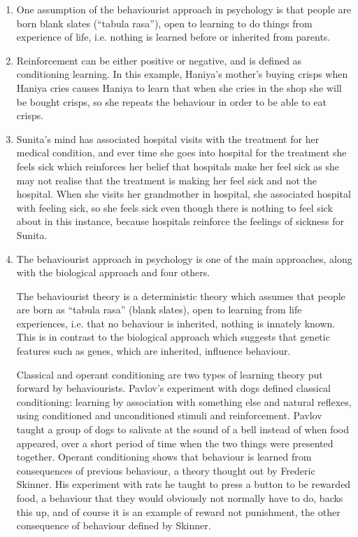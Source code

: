 \documentclass[a4paper]{article}
\begin{document}
	
\begin{enumerate}
	\item{One assumption of the behaviourist approach in psychology is that people are born blank slates (``tabula rasa''), open to learning to do things from experience of life, i.e. nothing is learned before or inherited from parents.}
	\item{Reinforcement can be either positive or negative, and is defined as conditioning learning.  In this example, Haniya's mother's buying crisps when Haniya cries causes Haniya to learn that when she cries in the shop she will be bought crisps, so she repeats the behaviour in order to be able to eat crisps.}
	\item{Sunita's mind has associated hospital visits with the treatment for her medical condition, and ever time she goes into hospital for the treatment she feels sick which reinforces her belief that hospitals make her feel sick as she may not realise that the treatment is making her feel sick and not the hospital.  When she visits her grandmother in hospital, she associated hospital with feeling sick, so she feels sick even though there is nothing to feel sick about in this instance, because hospitals reinforce the feelings of sickness for Sunita.}
	\item{The behaviourist approach in psychology is one of the main approaches, along with the biological approach and four others.
	
	The behaviourist theory is a deterministic theory which assumes that people are born as ``tabula rasa'' (blank slates), open to learning from life experiences, i.e. that no behaviour is inherited, nothing is innately known.  This is in contrast to the biological approach which suggests that genetic features such as genes, which are inherited, influence behaviour.
	
	Classical and operant conditioning are two types of learning theory put forward by behaviourists.  Pavlov's experiment with dogs defined classical conditioning: learning by association with something else and natural reflexes, using conditioned and unconditioned stimuli and reinforcement.  Pavlov taught a group of dogs to salivate at the sound of a bell instead of when food appeared, over a short period of time when the two things were presented together.  Operant conditioning shows that behaviour is learned from consequences of previous behaviour, a theory thought out by Frederic Skinner.  His experiment with rats he taught to press a button to be rewarded food, a behaviour that they would obviously not normally have to do, backs this up, and of course it is an example of reward not punishment, the other consequence of behaviour defined by Skinner.
	
}
\end{enumerate}
\end{document}
